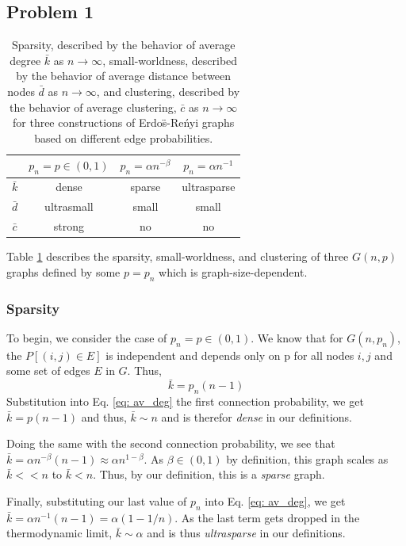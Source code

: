 \documentclass{neu-assignment}
\begin{document}
\maketitle


\subsection*{Problem 1} 
\begin{table}[h]
    \centering
    \begin{tabular}{c | c | c | c}
     & $p_n = p \in (0,1)$ & $p_n = \alpha n^{-\beta}$  &  $p_n = \alpha n^{-1}$\\
     \hline
     $\bar{k}$ & dense &  sparse & ultrasparse\\
     $\bar{d}$ & ultrasmall & small & small \\
     $\bar{c}$ & strong & no & no\\
    \end{tabular}
    \caption{Sparsity, described by the behavior of average degree $\bar{k}$ as $n \to \infty$, small-worldness, described by the behavior of average distance between nodes $\bar{d}$ as $n \to \infty$, and clustering, described by the behavior of average clustering, $\bar{c}$ as $n \to \infty$ for three constructions of Erdo\"s-Re\'nyi graphs based on different edge probabilities.}
    \label{tab:my_table}
\end{table}

Table \ref{tab:my_table} describes the sparsity, small-worldness, and clustering of three $G(n,p)$ graphs defined by some $p=p_n$ which is graph-size-dependent. 
\subsubsection*{Sparsity}
To begin, we consider the case of $p_n = p \in (0,1)$. We know that for $G(n, p_n)$, the $P[(i,j) \in E]$ is independent and depends only on p for all nodes $i,j$ and some set of edges $E$ in $G$. Thus, 
\begin{equation}
    \bar{k} = p_n(n-1)
    \label{eq: av_deg}
\end{equation}
Substitution into Eq. \ref{eq: av_deg} the first connection probability, we get $\bar{k}=p(n-1)$ and thus, $\bar{k} \sim n$ and is therefor \textit{dense} in our definitions. 
\par
Doing the same with the second connection probability, we see that $\bar{k} = \alpha n^{-\beta}(n-1) \approx \alpha n^{1-\beta}$. As $\beta \in (0,1)$ by definition, this graph scales as $\bar{k} << n$ to $\bar{k} < n$. Thus, by our definition, this is a \textit{sparse} graph.
\par
Finally, substituting our last value of $p_n$ into Eq. \ref{eq: av_deg}, we get $\bar{k} = \alpha n^{-1}(n-1) = \alpha(1 - 1/n)$. As the last term gets dropped in the thermodynamic limit, $\bar{k} \sim \alpha$ and is thus \textit{ultrasparse} in our definitions. 
\end{document}
